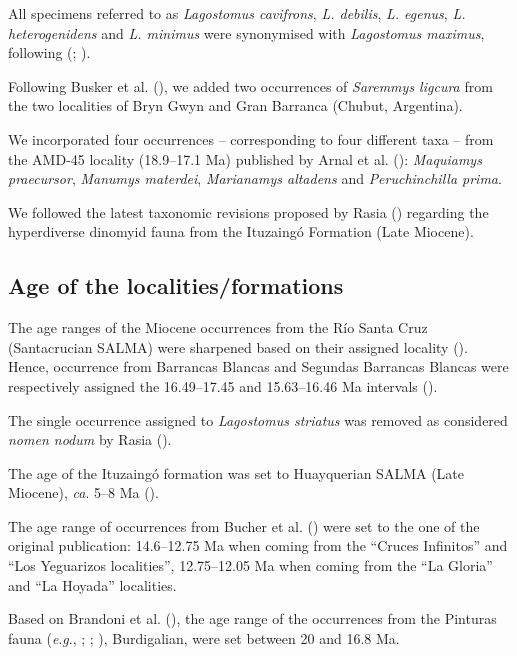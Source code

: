 \documentclass[
  9pt,
  letterpaper,
]{article}
\begin{document}
All specimens referred to as \emph{Lagostomus cavifrons}, \emph{L.
debilis}, \emph{L. egenus}, \emph{L. heterogenidens} and \emph{L.
minimus} were synonymised with \emph{Lagostomus maximus}, following
(;
).

Following Busker et al. (), we added two
occurrences of \emph{Saremmys ligcura} from the two localities of Bryn
Gwyn and Gran Barranca (Chubut, Argentina).

We incorporated four occurrences -- corresponding to four different taxa
-- from the AMD-45 locality (18.9--17.1 Ma) published by Arnal et al.
(): \emph{Maquiamys praecursor},
\emph{Manumys materdei}, \emph{Marianamys altadens} and
\emph{Peruchinchilla prima}.

We followed the latest taxonomic revisions proposed by Rasia
() regarding the hyperdiverse dinomyid
fauna from the Ituzaingó Formation (Late Miocene).

\subsection{Age of the
localities/formations}\label{age-of-the-localitiesformations}

The age ranges of the Miocene occurrences from the Río Santa Cruz
(Santacrucian SALMA) were sharpened based on their assigned locality
(). Hence, occurrence from
Barrancas Blancas and Segundas Barrancas Blancas were respectively
assigned the 16.49--17.45 and 15.63--16.46 Ma intervals
().

The single occurrence assigned to \emph{Lagostomus striatus} was removed
as considered \emph{nomen nodum} by Rasia
().

The age of the Ituzaingó formation was set to Huayquerian SALMA (Late
Miocene), \emph{ca}. 5--8 Ma ().

The age range of occurrences from Bucher et al.
() were set to the one of the original
publication: 14.6--12.75 Ma when coming from the ``Cruces Infinitos''
and ``Los Yeguarizos localities'', 12.75--12.05 Ma when coming from the
``La Gloria'' and ``La Hoyada'' localities.

Based on Brandoni et al. (), the age
range of the occurrences from the Pinturas fauna (\emph{e}.\emph{g}.,
;
; ),
Burdigalian, were set between 20 and 16.8 Ma.
\end{document}
